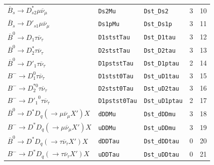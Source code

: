 \begin{table}[!htb]
\begin{tabular}{lllrr}
 $\overline{B}_s \rightarrow D_{s2}^* \mu \overline{\nu}_\mu$                      & \texttt{Ds2Mu}                    & \texttt{Dst\_Ds2}          &                     3 &               10 \\
 $\overline{B}_s \rightarrow D'_{s1} \mu \overline{\nu}_\mu$                       & \texttt{Ds1pMu}                   & \texttt{Dst\_Ds1p}         &                     3 &               11 \\
 $\overline{B}^0 \rightarrow D_1 \tau \overline{\nu}_\tau$                         & \texttt{D1ststTau}                & \texttt{Dst\_D1tau}        &                     3 &               12 \\
 $\overline{B}^0 \rightarrow D^*_2 \tau \overline{\nu}_\tau$                       & \texttt{D2ststTau}                & \texttt{Dst\_D2tau}        &                     3 &               13 \\
 $\overline{B}^0 \rightarrow D'_1 \tau \overline{\nu}_\tau$                        & \texttt{D1pststTau}               & \texttt{Dst\_D1ptau}       &                     2 &               14 \\
 $B^- \rightarrow D_1^0 \tau \overline{\nu}_\tau$                                  & \texttt{D1stst0Tau}               & \texttt{Dst\_uD1tau}       &                     3 &               15 \\
 $B^- \rightarrow D_2^{*0} \tau \overline{\nu}_\tau$                               & \texttt{D2stst0Tau}               & \texttt{Dst\_uD2tau}       &                     3 &               16 \\
 $B^- \rightarrow {D'_1}^0 \tau \overline{\nu}_\tau$                               & \texttt{D1pstst0Tau}              & \texttt{Dst\_uD1ptau}      &                     2 &               17 \\
 $\overline{B}^0 \rightarrow D^* D_q (\rightarrow \mu \overline{\nu}_\mu X') X$    & \texttt{dDDMu}                    & \texttt{Dst\_dDDmu}        &                     3 &               18 \\
 $B^- \rightarrow D^* D_q (\rightarrow \mu \overline{\nu}_\mu X') X$               & \texttt{uDDMu}                    & \texttt{Dst\_uDDmu}        &                     3 &               19 \\
 $\overline{B}^0 \rightarrow D^* D_q (\rightarrow \tau \overline{\nu}_\tau X') X$  & \texttt{dDDTau}                   & \texttt{Dst\_dDDtau}       &                     0 &               20 \\
 $B^- \rightarrow D^* D_q (\rightarrow \tau \overline{\nu}_\tau X') X$             & \texttt{uDDTau}                   & \texttt{Dst\_uDDtau}       &                     0 &               21 \\

\end{tabular}
\end{table}
